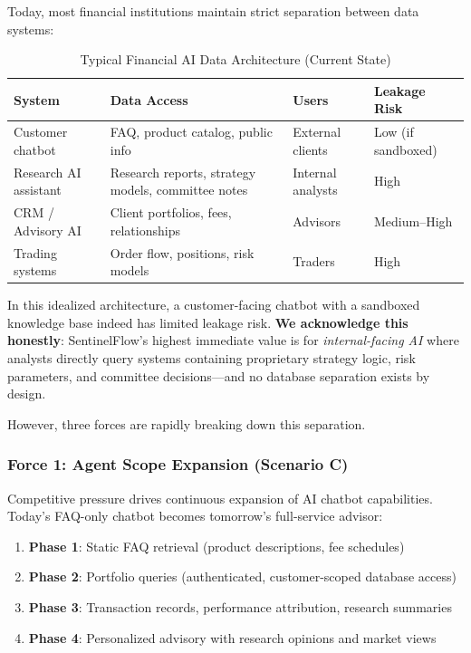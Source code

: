 \documentclass[12pt,a4paper]{article}
\begin{document}
Today, most financial institutions maintain strict separation between data systems:

\begin{table}[H]
\centering
\caption{Typical Financial AI Data Architecture (Current State)}
\label{tab:current_arch}
\small
\begin{tabular}{p{3cm}p{4cm}p{3.5cm}p{2.5cm}}
\toprule
\textbf{System} & \textbf{Data Access} & \textbf{Users} & \textbf{Leakage Risk} \\
\midrule
Customer chatbot & FAQ, product catalog, public info & External clients & Low (if sandboxed) \\
Research AI assistant & Research reports, strategy models, committee notes & Internal analysts & High \\
CRM / Advisory AI & Client portfolios, fees, relationships & Advisors & Medium--High \\
Trading systems & Order flow, positions, risk models & Traders & High \\
\bottomrule
\end{tabular}
\end{table}

In this idealized architecture, a customer-facing chatbot with a sandboxed knowledge base indeed has limited leakage risk. \textbf{We acknowledge this honestly}: SentinelFlow's highest immediate value is for \textit{internal-facing AI} where analysts directly query systems containing proprietary strategy logic, risk parameters, and committee decisions---and no database separation exists by design.

However, three forces are rapidly breaking down this separation.

\subsubsection{Force 1: Agent Scope Expansion (Scenario C)}

Competitive pressure drives continuous expansion of AI chatbot capabilities. Today's FAQ-only chatbot becomes tomorrow's full-service advisor:

\begin{enumerate}[leftmargin=*]
    \item \textbf{Phase 1}: Static FAQ retrieval (product descriptions, fee schedules)
    \item \textbf{Phase 2}: Portfolio queries (authenticated, customer-scoped database access)
    \item \textbf{Phase 3}: Transaction records, performance attribution, research summaries
    \item \textbf{Phase 4}: Personalized advisory with research opinions and market views
\end{enumerate}
\end{document}
